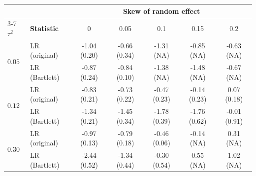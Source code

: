\begin{tabular}{llccccc}
\toprule
 &  & \multicolumn{5}{c}{\textbf{Skew of random effect}} \\
\cmidrule(lr){3-7}
\textbf{$\tau^2$} & \textbf{Statistic} & 0 & 0.05 & 0.1 & 0.15 & 0.2 \\
\midrule
\multirow{2}{*}{$0.05$} & LR (original) & -1.04 (0.20) & -0.66 (0.34) & -1.31 (NA) & -0.85 (NA) & -0.63 (NA) \\
 & LR (Bartlett) & -0.87 (0.24) & -0.84 (0.10) & -1.38 (NA) & -1.48 (NA) & -0.67 (NA) \\
\midrule
\multirow{2}{*}{$0.12$} & LR (original) & -0.83 (0.21) & -0.73 (0.22) & -0.47 (0.23) & -0.14 (0.23) & 0.07 (0.18) \\
 & LR (Bartlett) & -1.34 (0.21) & -1.45 (0.34) & -1.78 (0.39) & -1.76 (0.62) & -0.01 (0.91) \\
\midrule
\multirow{2}{*}{$0.30$} & LR (original) & -0.97 (0.13) & -0.79 (0.18) & -0.46 (0.06) & -0.14 (NA) & 0.31 (NA) \\
 & LR (Bartlett) & -2.44 (0.52) & -1.34 (0.44) & -0.30 (0.54) & 0.55 (NA) & 1.02 (NA) \\
\bottomrule
\end{tabular}
